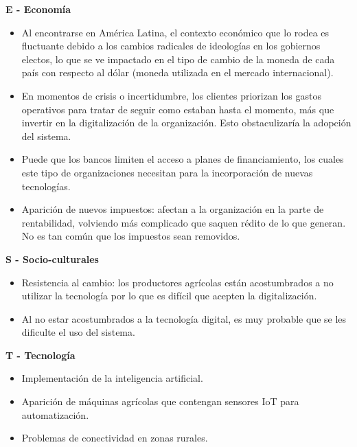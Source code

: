 \documentclass[man,12pt]{apa7}
\begin{document}
\textbf{E - Economía}
\begin{itemize}
    \item Al encontrarse en América Latina, el contexto económico que lo rodea es fluctuante debido a los cambios radicales de ideologías en los gobiernos electos, lo que se ve impactado en el tipo de cambio de la moneda de cada país con respecto al dólar (moneda utilizada en el mercado internacional).
    \item En momentos de crisis o incertidumbre, los clientes priorizan los gastos operativos para tratar de seguir como estaban hasta el momento, más que invertir en la digitalización de la organización. Esto obstaculizaría la adopción del sistema.
    \item Puede que los bancos limiten el acceso a planes de financiamiento, los cuales este tipo de organizaciones necesitan para la incorporación de nuevas tecnologías.
    \item Aparición de nuevos impuestos: afectan a la organización en la parte de rentabilidad, volviendo más complicado que saquen rédito de lo que generan. No es tan común que los impuestos sean removidos.
\end{itemize}

\textbf{S - Socio-culturales}
\begin{itemize}
    \item Resistencia al cambio: los productores agrícolas están acostumbrados a no utilizar la tecnología por lo que es difícil que acepten la digitalización.
    \item Al no estar acostumbrados a la tecnología digital, es muy probable que se les dificulte el uso del sistema.
\end{itemize}

\textbf{T - Tecnología}
\begin{itemize}
    \item Implementación de la inteligencia artificial.
    \item Aparición de máquinas agrícolas que contengan sensores IoT para automatización.
    \item Problemas de conectividad en zonas rurales.
\end{itemize}
\end{document}

